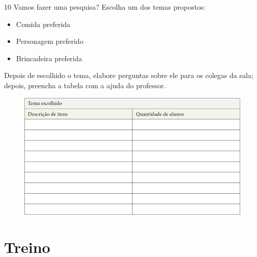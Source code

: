 
\num{10} Vamos fazer uma pesquisa? Escolha um dos temas propostos:

\begin{itemize}
\item
  Comida preferida
\item
  Personagem preferido
\item
  Brincadeira preferida
\end{itemize}

\pagebreak
Depois de escolhido o tema, elabore perguntas sobre ele para os colegas da sala; depois,
preencha a tabela com a ajuda do professor.

\begin{figure}[htpb!]
\includegraphics[width=\textwidth]{./media/image98.png}
\end{figure}





\section*{Treino}

